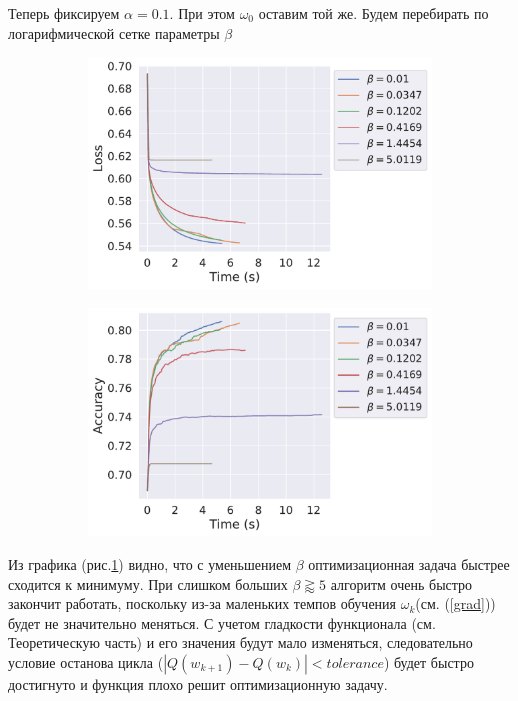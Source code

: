 \begin{enumerate}
	Теперь фиксируем $\alpha = 0.1$. При этом $\omega_0$ оставим той же. Будем перебирать по логарифмической сетке параметры $\beta$ 
    \begin{figure}[h]
        \begin{subfigure}{.5\textwidth}
            \centering
            \includegraphics[width=\linewidth]{./experiment1/beta/gd_loss_time.pdf}
            \caption{}
        \end{subfigure}%
        \begin{subfigure}{.5\textwidth}
            \centering
            \includegraphics[width=\linewidth]{./experiment1/beta/gd_acc_time.pdf}
            \caption{}
        \end{subfigure}
    \caption{}
    \label{eq:exp1_fig4}
	\end{figure}
	
	Из графика (рис.\ref{eq:exp1_fig4}) видно, что с уменьшением $\beta$ оптимизационная задача быстрее сходится к минимуму. При слишком больших $\beta\gtrapprox\!\!5$ алгоритм очень быстро закончит работать, поскольку из-за маленьких темпов обучения $\omega_k$(см. (\ref{grad})) будет не значительно меняться. С учетом гладкости функционала (см. Теоретическую часть) и его значения будут мало изменяться, следовательно условие останова цикла ($|Q(w_{k+1}) - Q(w_{k})| < tolerance$) будет быстро достигнуто и функция плохо решит оптимизационную задачу.


\end{enumerate}

